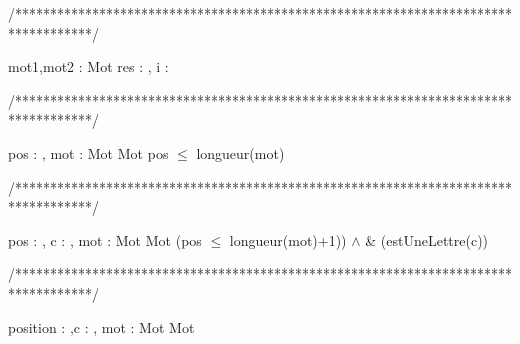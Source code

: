 /***********************************************************************************/
\begin{algorithme}
     {mot1,mot2 : Mot}%
     {\booleen}%
     {res : \booleen, i : \entier }%
     {
                  {
                  }%
                  {
                    {
                       {
                       }
                       {
                       }
                    }
                   }%
      
      }
\end{algorithme}

/***********************************************************************************/
\begin{algorithme}
       {pos : \entier, mot : Mot}
       {Mot}
       {pos $\leq$ longueur(mot)}
       {}
       {
             {
             }
            
        }
\end{algorithme}

/***********************************************************************************/
\begin{algorithme}
       {pos : \entier, c : \caractere, mot : Mot}%
       {Mot}%
       {(pos $\leq$ longueur(mot)+1)) $\land$ \& (estUneLettre(c))}%
       {}
       {
                {
                }
       }
\end{algorithme}

/***********************************************************************************/
\begin{algorithme}%
       {position : \entier,c : \caractere, mot : Mot}%
       {Mot}%
       {}
       {
       
       }
\end{algorithme}

